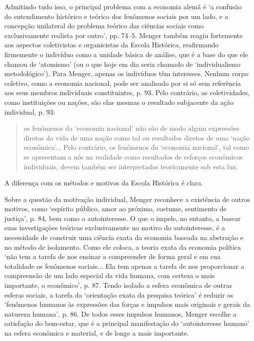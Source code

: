\documentclass[12pt]{article}
\begin{document}
Admitindo tudo isso, o principal problema com a economia alemã é ‘a confusão do entendimento histórico e teórico dos fenômenos sociais por um lado, e a concepção unilateral do problema teórico das ciências sociais como exclusivamente realista por outro’, pp. 74–5. Menger também reagiu fortemente aos aspectos coletivistas e organicistas da Escola Histórica, reafirmando firmemente o indivíduo como a unidade básica de análise, que é a base do que ele chamou de ‘atomismo’ (ou o que hoje em dia seria chamado de ‘individualismo metodológico’). Para Menger, apenas os indivíduos têm interesses. Nenhum corpo coletivo, como a economia nacional, pode ser analisado por si só sem referência aos seus membros individuais constituintes, p. 93. Pelo contrário, as coletividades, como instituições ou nações, são elas mesmas o resultado subjacente da ação individual, p. 93:

\begin{quote}
os fenômenos da ‘economia nacional’ não são de modo algum expressões diretas da vida de uma nação como tal ou resultados diretos de uma ‘nação econômica’... Pelo contrário, os fenômenos da ‘economia nacional’, tal como se apresentam a nós na realidade como resultados de esforços econômicos individuais, devem também ser interpretados teoricamente sob esta luz.
\end{quote}

A diferença com os métodos e motivos da Escola Histórica é clara.

Sobre a questão da motivação individual, Menger reconhece a existência de outros motivos, como ‘espírito público, amor ao próximo, costume, sentimento de justiça’, p. 84, bem como o autointeresse. O que o impele, no entanto, a basear suas investigações teóricas exclusivamente no motivo do autointeresse, é a necessidade de construir uma ciência exata da economia baseada na abstração e no método de isolamento. Como ele coloca, a teoria exata da economia política ‘não tem a tarefa de nos ensinar a compreender de forma geral e em sua totalidade os fenômenos sociais... Ela tem apenas a tarefa de nos proporcionar a compreensão de um lado especial da vida humana, com certeza o mais importante, o econômico’, p. 87. Tendo isolado a esfera econômica de outras esferas sociais, a tarefa da ‘orientação exata da pesquisa teórica’ é reduzir os ‘fenômenos humanos às expressões das forças e impulsos mais originais e gerais da natureza humana’, p. 86. De todos esses impulsos humanos, Menger escolhe a satisfação do bem-estar, que é a principal manifestação do ‘autointeresse humano’ na esfera econômica e material, e de longe a mais importante.
\end{document}
